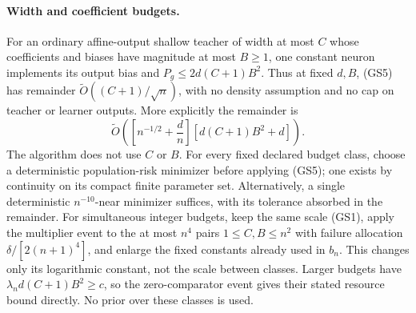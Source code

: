\paragraph{Width and coefficient budgets.}
For an ordinary affine-output shallow teacher of width at most $C$
whose coefficients and biases have magnitude at most $B\ge1$, one
constant neuron implements its output bias and
$P_g\le2d(C+1)B^2$. Thus at fixed $d,B$, (GS5) has remainder
$\widetilde O((C+1)/\sqrt n)$, with no density assumption and no
cap on teacher or learner outputs. More explicitly the remainder is
\[
 \widetilde O\left(
 \left[n^{-1/2}+\frac d n\right]
                  [d(C+1)B^2+d]\right).                 \tag{GS6}
\]
The algorithm does not use $C$ or $B$. For every fixed declared
budget class, choose a deterministic population-risk minimizer before
applying (GS5); one exists by continuity on its compact finite
parameter set. Alternatively, a single deterministic $n^{-10}$-near
minimizer suffices, with its tolerance absorbed in the remainder.
For simultaneous integer budgets, keep the same scale (GS1), apply
the multiplier event to the at most $n^4$ pairs $1\le C,B\le n^2$
with failure allocation $\delta/[2(n+1)^4]$, and enlarge the fixed
constants already used in $b_n$. This changes only its logarithmic
constant, not the scale between classes. Larger budgets have
$\lambda_n d(C+1)B^2\ge c$, so the zero-comparator event gives their
stated resource bound directly. No prior over these classes is used.
